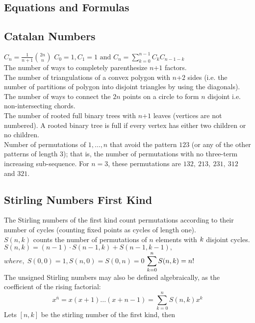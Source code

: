\documentclass[10pt,a4paper,onesided]{article}
\begin{document}
\begin{multicols*}{2}
\newpage
\section{Equations and Formulas}
\subsection{Catalan Numbers}
$\displaystyle C_n=\frac{1}{n+1}{2n \choose n}$
$\displaystyle C_0=1,C_1=1\text{ and }C_n=\sum \limits_{k=0}^{n-1}C_k C_{n-1-k}$ \\
The number of ways to completely parenthesize $n$+$\displaystyle 1$ factors. \\
The number of triangulations of a convex polygon with $n$+$\displaystyle 2$ sides (i.e. the number of partitions of polygon into disjoint triangles by using the diagonals). \\
The number of ways to connect the $\displaystyle 2n$ points on a circle to form $n$ disjoint i.e. non-intersecting chords. \\
The number of rooted full binary trees with $n$+$\displaystyle 1$ leaves (vertices are not numbered). A rooted binary tree is full if every vertex has either two children or no children. \\
Number of permutations of $\displaystyle {1, …, n}$ that avoid the pattern $\displaystyle 123$ (or any of the other patterns of length $3$); that is, the number of permutations with no three-term increasing sub-sequence. For $n = 3$, these permutations are $\displaystyle 132,\ 213,\ 231,\ 312$ and $321.$

\subsection{Stirling Numbers First Kind}
The Stirling numbers of the first kind count permutations according to their number of cycles (counting fixed points as cycles of length one). \\
$S(n,k)$ counts the number of permutations of $n$ elements with $\displaystyle \displaystyle k$ disjoint cycles. \\
$S(n,k)=(n-1) \cdot S(n-1,k)+S(n-1,k-1),$ \(where,\; S(0,0)=1,S(n,0)=S(0,n)=0\)
$\displaystyle \displaystyle\sum_{k=0}^{n}S(n,k) = n!$ \\
The unsigned Stirling numbers may also be defined algebraically, as the coefficient of the rising factorial:
\[\displaystyle x^{\bar{n}} = x(x+1)...(x+n-1) = \sum_{k=0}^{n}{ S(n, k) x^k}\]
Lets $[n, k]$ be the stirling number of the first kind, then


\end{multicols*}
\end{document}
